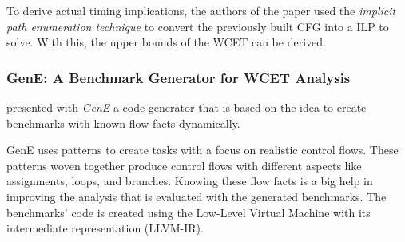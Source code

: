 To derive actual timing implications, the authors of the paper used the \textit{implicit path enumeration technique} to convert the previously built \ac{CFG} into a \ac{ILP} to solve.
With this, the upper bounds of the \ac{WCET} can be derived.

\subsubsection{GenE: A Benchmark Generator for WCET Analysis}\label{sec:related_work:3}
\textcite{wagemannGenEBenchmarkGenerator2015} presented with \textit{GenE} a code generator that is based on the idea to create benchmarks with known flow facts dynamically.

GenE uses patterns to create tasks with a focus on realistic control flows.
These patterns woven together produce control flows with different aspects like assignments, loops, and branches.
Knowing these flow facts is a big help in improving the analysis that is evaluated with the generated benchmarks.
The benchmarks' code is created using the Low-Level Virtual Machine with its intermediate representation (LLVM-IR).